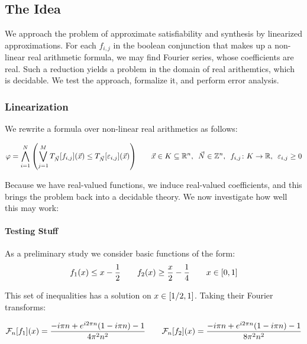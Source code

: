 \documentclass[12pt]{article}
\begin{document}
\subsection{The Idea}
We approach the problem of approximate satisfiability and synthesis
by linearized approximations.
For each $f_{i, j}$ in the boolean conjunction that makes up a
non-linear real arithmetic formula,
we may find Fourier series, whose coefficients are real.
Such a reduction yields a problem in the domain of real arithemtics, which
is decidable.
We test the approach, formalize it, and perform error analysis.

\subsubsection{Linearization}
We rewrite a formula over non-linear real arithmetics as follows:

\begin{align*}
  \varphi
    = \bigwedge_{i = 1}^{N} {\left(\bigvee_{j = 1}^{M}
      T_{\vec{N}} {\left[f_{i,j}\right]}{\left(\vec{x}\right)}
      \leq T_{\vec{N}} {\left[\varepsilon_{i,j}\right]} {\left(\vec{x}\right)}\right)}
  \qquad
  \vec{x} \in K \subseteq {\mathbb{R}}^n, \enskip
  \vec{N} \in {\mathbb{Z}}^n, \enskip
  {f_{i, j} \colon K \to {\mathbb{R}}}, \enskip
  \varepsilon_{i, j} \geq 0
\end{align*}

Because we have real-valued functions, we induce real-valued coefficients,
and this brings the problem back into a decidable theory.
We now investigate how well this may work:

\paragraph{Testing Stuff}
As a preliminary study we consider basic functions of the form:
\begin{align*}
  f_1 {\left(x\right)} \leq x - \frac{1}{2}
  \qquad
  f_2 {\left(x\right)} \geq \frac{x}{2} - \frac{1}{4}
  \qquad
  x \in {\left[0, 1\right]}
\end{align*}

This set of inequalities has a solution on $x \in {\left[1/2, 1\right]}$.
Taking their Fourier transforms:

\begin{align*}
  \mathcal{F}_n {\left[f_1\right]} {\left(x\right)}
    = \frac{-i \pi  n+e^{i 2  \pi  n} (1-i \pi  n)-1}{4 \pi ^2 n^2}
  \qquad
  \mathcal{F}_n {\left[f_2\right]} {\left(x\right)}
    = \frac{-i \pi  n+e^{i 2 \pi  n} (1-i \pi  n)-1}{8 \pi ^2 n^2}
\end{align*}
\end{document}
